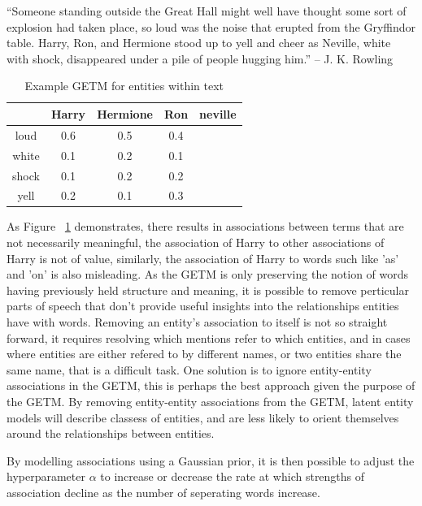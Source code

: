 \documentclass[10pt]{report}
\begin{document}
\begin{table}[h!]
  \centering
  \begin{displayquote}
 ``Someone standing outside the Great Hall might well have thought some
sort of explosion had taken place, so loud was the noise that erupted
from the Gryffindor table. Harry, Ron, and Hermione stood up to yell and
cheer as Neville, white with shock, disappeared under a pile of people
hugging him.'' -- J. K. Rowling
    \end{displayquote}
    \begin{tabular}{c | c c c c}
     &Harry&Hermione&Ron&neville\\
      \hline
      loud    & 0.6 & 0.5  & 0.4  & \\
      white   & 0.1 & 0.2  & 0.1  & \\
      shock   & 0.1 & 0.2  & 0.2  & \\
      yell    & 0.2 & 0.1  & 0.3  & \\  
    \end{tabular} 
  \caption{ Example GETM for entities within text \label{fig:getm_example}}
\end{table}

As Figure ~\ref{fig:getm_example} demonstrates, there results in associations between terms that are not necessarily meaningful, the association of Harry to other associations of Harry is not of value, similarly, the association of Harry to words such like 'as' and 'on' is also misleading. As the GETM is only preserving the notion of words having previously held structure and meaning, it is possible to remove perticular parts of speech that don't provide useful insights into the relationships entities have with words. Removing an entity's association to itself is not so straight forward, it requires resolving which mentions refer to which entities, and in cases where entities are either refered to by different names, or two entities share the same name, that is a difficult task. One solution is to ignore entity-entity associations in the GETM, this is perhaps the best approach given the purpose of the GETM. By removing entity-entity associations from the GETM, latent entity models will describe classess of entities, and are less likely to orient themselves around the relationships between entities.

By modelling associations using a Gaussian prior, it is then possible to adjust the hyperparameter \(\alpha\) to increase or decrease the rate at which strengths of association decline as the number of seperating words increase.
\end{document}
